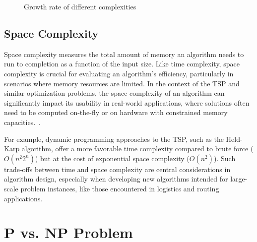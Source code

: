 \begin{figure}[h]
	\centering
	\caption{Growth rate of different complexities}
\end{figure}

\subsection{Space Complexity}

Space complexity measures the total amount of memory an algorithm needs to run to completion as a function of the input size. Like time complexity, space complexity is crucial for evaluating an algorithm's efficiency, particularly in scenarios where memory resources are limited. In the context of the TSP and similar optimization problems, the space complexity of an algorithm can significantly impact its usability in real-world applications, where solutions often need to be computed on-the-fly or on hardware with constrained memory capacities.~\cite{HeldKarp1962}.

For example, dynamic programming approaches to the TSP, such as the Held-Karp algorithm, offer a more favorable time complexity compared to brute force (\(O(n^2 2^n)\)) but at the cost of exponential space complexity (\(O(n^2)\)). Such trade-offs between time and space complexity are central considerations in algorithm design, especially when developing new algorithms intended for large-scale problem instances, like those encountered in logistics and routing applications.


\section{P vs. NP Problem}

